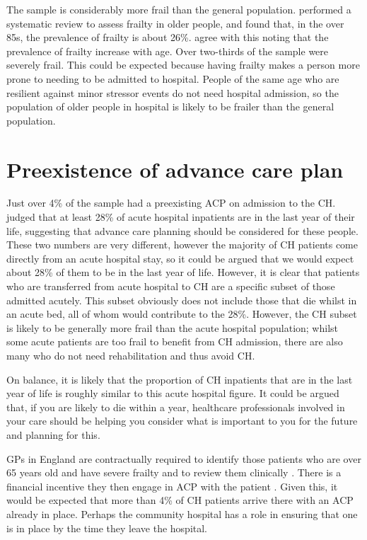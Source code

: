 \documentclass
[
	12pt,
	a4paper,
	oneside,
]{report}
\begin{document}
The sample is considerably more frail than the general population. 
\textcite{collard:12} performed a systematic review to assess frailty in older
people, and found that, in the over 85s, the prevalence of frailty is about
26\%. \textcite{clegg:13} agree with this noting that the prevalence of frailty
increase with age. Over two-thirds of the sample were severely frail. This could
be expected because having frailty makes a person more prone to needing to be
admitted to hospital. People of the same age who are resilient against
minor stressor events do not need hospital admission, so the population of older
people in hospital is likely to be frailer than the general population.

\section{Preexistence of advance care plan}

Just over 4\% of the sample had a preexisting ACP on admission to the CH. 
\textcite{clarke:14} judged that at least 28\% of acute hospital 
inpatients are in the last year of their life, suggesting that advance care 
planning should be considered for these people. 
These two numbers are very different, however the majority of CH patients 
come directly from an acute hospital
stay, so it could be argued that we would expect about 28\% of them to be in
the last year of life. However, it is clear that patients who are transferred 
from acute hospital to CH are a specific subset of those admitted acutely.
This subset obviously does not include those that die whilst in an acute bed,
all of whom would contribute to the 28\%.  However, the CH subset is likely 
to be generally more frail than the acute hospital population; whilst some
acute patients are too frail to benefit from CH admission, there are also many 
who do not need rehabilitation and thus avoid CH.

On balance, it is likely that the proportion of CH inpatients that are in the
last year of life is roughly similar to this acute hospital figure. It
could be argued that, if you are likely to die within a year, healthcare
professionals involved in your care should be helping you consider what
is important to you for the future and planning for this. 


GPs in England are contractually required to identify those patients who are 
over 65 years old and have severe frailty and to review them clinically
\parencite{nhse:17}. There is a financial incentive they then
engage in ACP with the patient \parencite{hunt:16}. Given
this, it would be expected that more than 4\% of CH patients arrive there
with an ACP already in place. Perhaps the community hospital has a role in
ensuring that one is in place by the time they leave the hospital.
\end{document}
